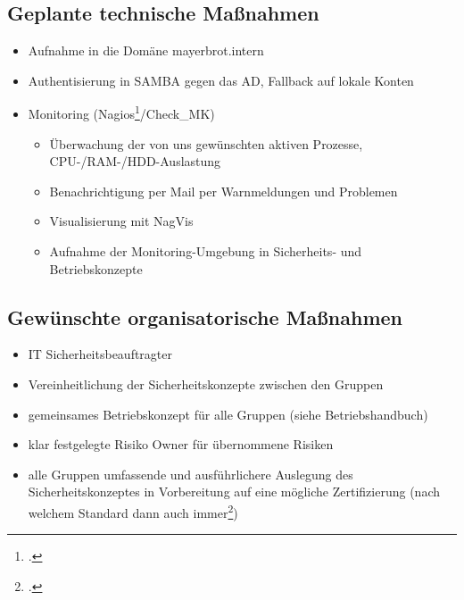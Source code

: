 \subsection{Geplante technische Maßnahmen}
\begin{itemize}
\item Aufnahme in die Domäne mayerbrot.intern
\item Authentisierung in SAMBA gegen das AD, Fallback auf lokale Konten
\item Monitoring (Nagios\footcite{nagios}/Check\_MK)
\begin{itemize}
	\item Überwachung der von uns gewünschten aktiven Prozesse, CPU-/RAM-/HDD-Auslastung
	\item Benachrichtigung per Mail per Warnmeldungen und Problemen
	\item Visualisierung mit NagVis
	\item Aufnahme der Monitoring-Umgebung in Sicherheits- und Betriebskonzepte
\end{itemize}
\end{itemize}

\subsection{Gewünschte organisatorische Maßnahmen}
\begin{itemize}
\item IT Sicherheitsbeauftragter
\item Vereinheitlichung der Sicherheitskonzepte zwischen den Gruppen 
\item gemeinsames Betriebskonzept für alle Gruppen (siehe Betriebshandbuch)
\item klar festgelegte Risiko Owner für übernommene Risiken
\item alle Gruppen umfassende und ausführlichere Auslegung des Sicherheitskonzeptes in Vorbereitung auf eine mögliche Zertifizierung (nach welchem Standard dann auch immer\footcite{wikiCyberSecStandards})
\end{itemize}

